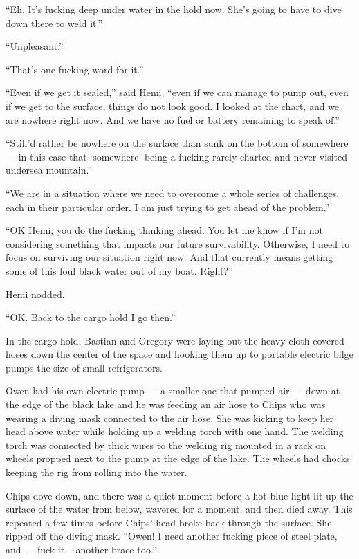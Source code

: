 \documentclass[
]{scrbook}
\begin{document}
``Eh. It's fucking deep under water in the hold now. She's going to have
to dive down there to weld it.''

``Unpleasant.''

``That's one fucking word for it.''

``Even if we get it sealed,'' said Hemi, ``even if we can manage to pump
out, even if we get to the surface, things do not look good. I looked at
the chart, and we are nowhere right now. And we have no fuel or battery
remaining to speak of.''

``Still'd rather be nowhere on the surface than sunk on the bottom of
somewhere --- in this case that `somewhere' being a fucking
rarely-charted and never-visited undersea mountain.''

``We are in a situation where we need to overcome a whole series of
challenges, each in their particular order. I am just trying to get
ahead of the problem.''

``OK Hemi, you do the fucking thinking ahead. You let me know if I'm not
considering something that impacts our future survivability. Otherwise,
I need to focus on surviving our situation right now. And that currently
means getting some of this foul black water out of my boat. Right?''

Hemi nodded.

``OK. Back to the cargo hold I go then.''

In the cargo hold, Bastian and Gregory were laying out the heavy
cloth-covered hoses down the center of the space and hooking them up to
portable electric bilge pumps the size of small refrigerators.

Owen had his own electric pump --- a smaller one that pumped air ---
down at the edge of the black lake and he was feeding an air hose to
Chips who was wearing a diving mask connected to the air hose. She was
kicking to keep her head above water while holding up a welding torch
with one hand. The welding torch was connected by thick wires to the
welding rig mounted in a rack on wheels propped next to the pump at the
edge of the lake. The wheels had chocks keeping the rig from rolling
into the water.

Chips dove down, and there was a quiet moment before a hot blue light
lit up the surface of the water from below, wavered for a moment, and
then died away. This repeated a few times before Chips' head broke back
through the surface. She ripped off the diving mask. ``Owen! I need
another fucking piece of steel plate, and --- fuck it -- another brace
too.''
\end{document}
